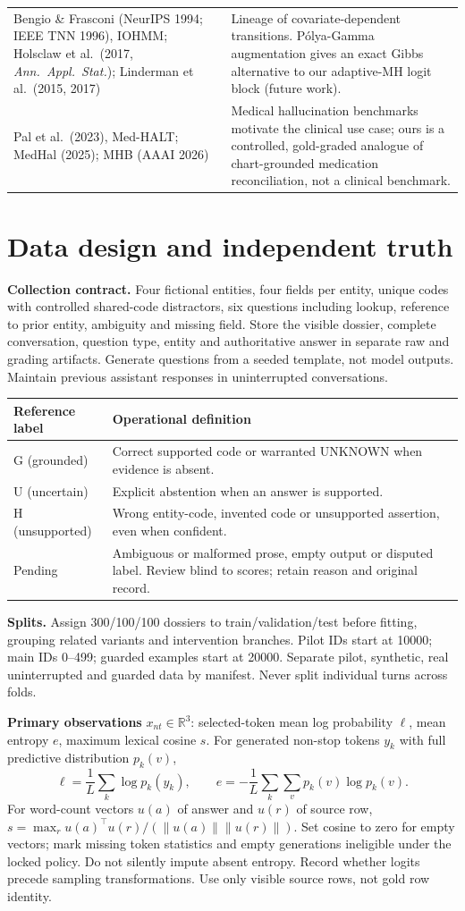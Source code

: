 \documentclass[11pt,letterpaper]{article}
\newcommand{\R}{\mathbb R}
\newcommand{\sectionpage}[1]{\clearpage\section{#1}}
\begin{document}
\begin{tabularx}{\linewidth}{p{.34\linewidth}X}
Bengio \& Frasconi (NeurIPS 1994; IEEE TNN 1996), IOHMM; Holsclaw et al.\ (2017, \emph{Ann.\ Appl.\ Stat.}); Linderman et al.\ (2015, 2017) & Lineage of covariate-dependent transitions. P\'olya-Gamma augmentation gives an exact Gibbs alternative to our adaptive-MH logit block (future work). \\
Pal et al.\ (2023), Med-HALT; MedHal (2025); MHB (AAAI 2026) & Medical hallucination benchmarks motivate the clinical use case; ours is a controlled, gold-graded analogue of chart-grounded medication reconciliation, not a clinical benchmark. \\ \bottomrule
\end{tabularx}

\sectionpage{Data design and independent truth}
\textbf{Collection contract.} Four fictional entities, four fields per entity, unique codes with controlled shared-code distractors, six questions including lookup, reference to prior entity, ambiguity and missing field. Store the visible dossier, complete conversation, question type, entity and authoritative answer in separate raw and grading artifacts. Generate questions from a seeded template, not model outputs. Maintain previous assistant responses in uninterrupted conversations.


\begin{tabularx}{\linewidth}{p{.17\linewidth}X}
\toprule Reference label & Operational definition \\ \midrule
G (grounded) & Correct supported code or warranted UNKNOWN when evidence is absent. \\
U (uncertain) & Explicit abstention when an answer is supported. \\
H (unsupported) & Wrong entity-code, invented code or unsupported assertion, even when confident. \\
Pending & Ambiguous or malformed prose, empty output or disputed label. Review blind to scores; retain reason and original record. \\ \bottomrule
\end{tabularx}

\textbf{Splits.} Assign 300/100/100 dossiers to train/validation/test before fitting, grouping related variants and intervention branches. Pilot IDs start at 10000; main IDs 0--499; guarded examples start at 20000. Separate pilot, synthetic, real uninterrupted and guarded data by manifest. Never split individual turns across folds.

\textbf{Primary observations} $x_{nt}\in\R^3$: selected-token mean log probability $\ell$, mean entropy $e$, maximum lexical cosine $s$. For generated non-stop tokens $y_k$ with full predictive distribution $p_k(v)$,
\[
\ell=\frac1L\sum_k\log p_k(y_k),\qquad
e=-\frac1L\sum_k\sum_v p_k(v)\log p_k(v).
\]
For word-count vectors $u(a)$ of answer and $u(r)$ of source row, $s=\max_r u(a)^\top u(r)/(\|u(a)\|\|u(r)\|)$. Set cosine to zero for empty vectors; mark missing token statistics and empty generations ineligible under the locked policy. Do not silently impute absent entropy. Record whether logits precede sampling transformations. Use only visible source rows, not gold row identity.
\end{document}
